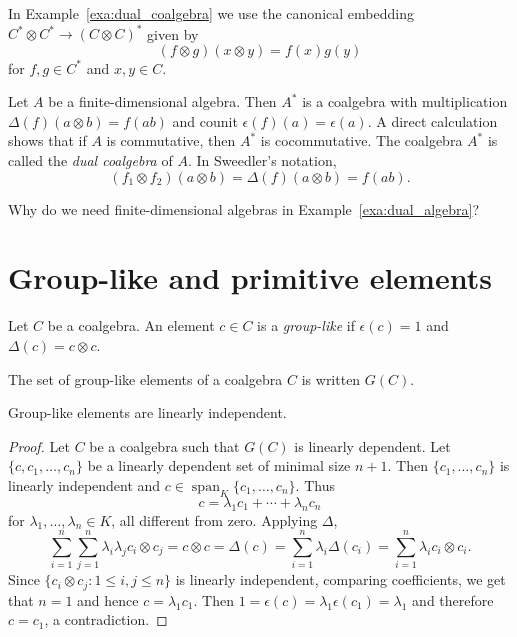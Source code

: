 In Example~\ref{exa:dual_coalgebra} we use 
the canonical 
embedding $C^*\otimes C^*\to (C\otimes C)^*$ given by 
\[
(f\otimes g)(x\otimes y)=f(x)g(y)
\]
for $f,g\in C^*$ and $x,y\in C$. 


\begin{example}
\label{exa:dual_algebra}
    Let $A$ be a finite-dimensional algebra. Then $A^*$ is 
    a coalgebra with multiplication 
    $\Delta(f)(a\otimes b)=f(ab)$ and counit 
    $\epsilon(f)(a)=\epsilon(a)$. A direct calculation shows that 
    if $A$ is commutative, then $A^*$ is cocommutative. The  
    coalgebra $A^*$ is called the \emph{dual coalgebra} of $A$. In Sweedler's notation,
    \[
      (f_1\otimes f_2)(a\otimes b)=\Delta(f)(a\otimes b)=f(ab).
    \]
\end{example}

Why do we need finite-dimensional algebras in Example~\ref{exa:dual_algebra}? 

\section{Group-like and primitive elements}

\begin{definition}
    Let $C$ be a coalgebra. An element $c\in C$ is 
    a \emph{group-like} if $\epsilon(c)=1$ and 
    $\Delta(c)=c\otimes c$.  
\end{definition}

The set of group-like elements of a coalgebra $C$ 
is written $G(C)$. 

\begin{proposition}
    Group-like elements are linearly independent. 
\end{proposition}

\begin{proof}
    Let $C$ be a coalgebra such that $G(C)$ is linearly dependent. Let
    $\{c,c_1,\dots,c_n\}$ be a linearly dependent set of minimal size $n+1$. Then 
    $\{c_1,\dots,c_n\}$ is linearly independent and
    $c\in\operatorname{span}_K\{c_1,\dots,c_n\}$. Thus 
    \[
    c=\lambda_1c_1+\cdots+\lambda_nc_n
    \]
    for $\lambda_1,\dots,\lambda_n\in K$, all different from
    zero. 
    Applying $\Delta$, 
    \[
    \sum_{i=1}^{n}\sum_{j=1}^{n}\lambda_i\lambda_jc_i\otimes c_j=c\otimes c=\Delta(c)
    =\sum_{i=1}^{n}\lambda_i\Delta(c_i)
    =\sum_{i=1}^{n}\lambda_ic_i\otimes c_i.
    \]
    Since $\{c_i\otimes c_j:1\leq i,j\leq n\}$ is linearly
    independent, comparing coefficients, we 
    get that $n=1$ and hence $c=\lambda_1c_1$. Then 
    $1=\epsilon(c)=\lambda_1\epsilon(c_1)=\lambda_1$ 
    and therefore $c=c_1$, a contradiction. 
\end{proof}

